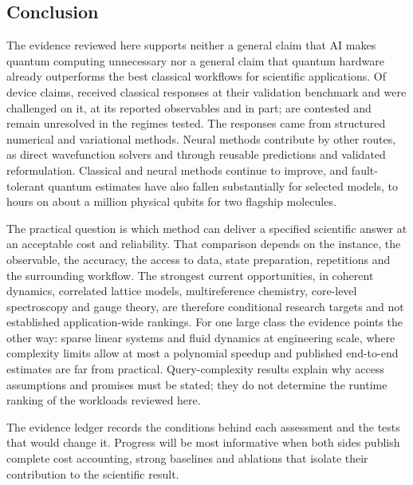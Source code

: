\documentclass[10pt,a4paper]{article}
\begin{document}
\subsection{Conclusion}
\label{sec:conclusion}
The evidence reviewed here supports neither a general claim that AI makes quantum computing unnecessary nor a general claim that quantum hardware already outperforms the best classical workflows for scientific applications. Of \wTimeline{} device claims, \wTLvalidation{} received classical responses at their validation benchmark and \wTLchallenged{} were challenged on it, \wTLobservables{} at its reported observables and \wTLpartial{} in part; \wTLcontested{} are contested and \wTLopen{} remain unresolved in the regimes tested. The responses came from structured numerical and variational methods. Neural methods contribute by other routes, as direct wavefunction solvers and through reusable predictions and validated reformulation. Classical and neural methods continue to improve, and fault-tolerant quantum estimates have also fallen substantially for selected models, to hours on about a million physical qubits for two flagship molecules.

The practical question is which method can deliver a specified scientific answer at an acceptable cost and reliability. That comparison depends on the instance, the observable, the accuracy, the access to data, state preparation, repetitions and the surrounding workflow. The strongest current opportunities, in coherent dynamics, correlated lattice models, multireference chemistry, core-level spectroscopy and gauge theory, are therefore conditional research targets and not established application-wide rankings. For one large class the evidence points the other way: sparse linear systems and fluid dynamics at engineering scale, where complexity limits allow at most a polynomial speedup and published end-to-end estimates are far from practical. Query-complexity results explain why access assumptions and promises must be stated; they do not determine the runtime ranking of the workloads reviewed here.

The evidence ledger records the conditions behind each assessment and the tests that would change it. Progress will be most informative when both sides publish complete cost accounting, strong baselines and ablations that isolate their contribution to the scientific result.

\end{document}

